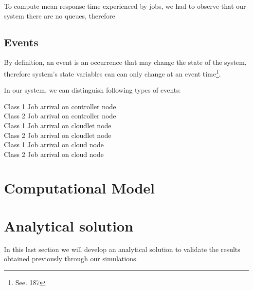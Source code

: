 \documentclass[10pt,a4paper]{article}
\begin{document}
To compute mean response time experienced by jobs, we had to observe that our system there are no queues, therefore 


\subsection{Events}

By definition, an event is an occurrence that may change the state of the system, therefore system's state variables can can only change at an event time\footnote{See. 187}.

In our system, we can distinguish following types of events:

\begin{description}

\item[Class 1 Job arrival on controller node]

\item[Class 2 Job arrival on controller node]

\item[Class 1 Job arrival on cloudlet node]

\item[Class 2 Job arrival on cloudlet node]

\item[Class 1 Job arrival on cloud node]

\item[Class 2 Job arrival on cloud node]


\end{description}









\newpage
\section{Computational Model}








\newpage
\section{Analytical solution}

In this last section we will develop an analytical solution to validate the results obtained previously through our simulations. 
\end{document}
